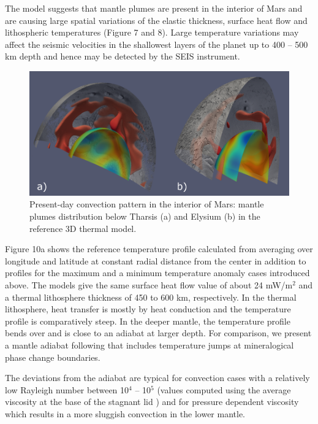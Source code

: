 The model suggests that mantle plumes are present in the interior of Mars and are causing large spatial variations of the elastic thickness, surface heat flow and lithospheric temperatures (Figure 7 and 8). Large temperature variations may affect the seismic velocities in the shallowest layers of the planet up to 400 -- 500 km depth and hence may be detected by the SEIS instrument.
%
\begin{figure}[h!]
\begin{center}
\includegraphics[width=\textwidth]
{figures/Fig5.png}
\caption{Present-day convection pattern in the interior of Mars: mantle plumes distribution below Tharsis (a) and Elysium (b) in the reference 3D thermal model.}
\label{fig:Fig5.png} 
\end{center}
\end{figure}
%

Figure 10a shows the reference temperature profile calculated from averaging over longitude and latitude at constant radial distance from the center in addition to profiles for the maximum and a minimum temperature anomaly cases introduced above. The models give the same surface heat flow value of about 24 mW/m$^2$ and a thermal lithosphere thickness of 450 to 600 km, respectively. In the thermal lithosphere, heat transfer is mostly by heat conduction and the temperature profile is comparatively steep. In the deeper mantle, the temperature profile bends over and is close to an adiabat at larger depth. For comparison, we present a mantle adiabat following \citet{Khan2018} that includes temperature jumps at mineralogical phase change boundaries. 

The deviations from the adiabat are typical for convection cases with a relatively low Rayleigh number between 10$^4$ -- 10$^5$ (values computed using the average viscosity at the base of the stagnant lid ) and for pressure dependent viscosity which results in a more sluggish convection in the lower mantle.  

